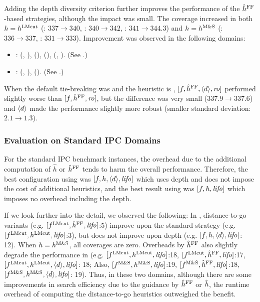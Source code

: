 Adding the depth diversity criterion further improves the performance of the $\hat{h}^{\text{FF}}$-based strategies,
 although the impact was small.
The coverage increased in both
 $h=h^\text{LMcut}$ (\fifo: $337\rightarrow 340$, \lifo: $340\rightarrow 342$, \ro: $341\rightarrow 344.3$) and
 $h=h^\text{M\&S}$ (\fifo: $336\rightarrow 337$, \lifo: $331\rightarrow 333$).
Improvement was observed in the following domains:
\begin{itemize}
 \item \textbf{\lmcut}:  (\lifo, \ro),  (\ro),  (\fifo),  (\fifo, \ro). (See .)
 \item \textbf{\mands}:  (\lifo, \ro),  (\fifo). (See .)
\end{itemize}
When the default tie-breaking was \ro and the heuristic is \mands, $[f,\hat{h}^{\text{FF}},{\left<d\right>},{\text{\textit{ro}}}]$ performed slightly worse than 
$[f,\hat{h}^{\text{FF}},{\text{\textit{ro}}}]$, but the difference was very small  ($337.9\rightarrow 337.6$) and ${\left<d\right>}$ made the performance slightly more robust (smaller standard deviation: $2.1\rightarrow 1.3$).

\subsubsection{Evaluation on Standard IPC Domains}

For the standard IPC benchmark instances, the overhead due to the additional computation of
$\hat{h}$ or $\hat{h}^{\text{FF}}$ tends to harm the overall performance.
Therefore, the best configuration using \lmcut was
$[f,h,{\left<d\right>},{\text{\textit{lifo}}}]$ which uses depth and does not impose the cost of
additional heuristics, and the best result using \mands
was $[f,h,{\text{\textit{lifo}}}]$ which imposes no overhead including the depth.

If we look further into the detail, we observed the following:
In , distance-to-go variants (e.g. $[f^\text{LMcut},\hat{h}^{\text{FF}},{\text{\textit{lifo}}}]$:5) improve upon the standard strategy (e.g. $[f^\text{LMcut},h^\text{LMcut},{\text{\textit{lifo}}}]$:3), but does not improve upon depth (e.g. $[f,h,{\left<d\right>},{\text{\textit{lifo}}}]$: 12). When $h=h^\text{M\&S}$, all coverages are zero. Overheads by $\hat{h}^{\text{FF}}$ also slightly degrade the performance in  (e.g. $[f^\text{LMcut},h^\text{LMcut},{\text{\textit{lifo}}}]$:18, $[f^\text{LMcut},\hat{h}^{\text{FF}},{\text{\textit{lifo}}}]$:17, $[f^\text{LMcut},h^\text{LMcut},{\left<d\right>},{\text{\textit{lifo}}}]$: 18; Also, $[f^\text{M\&S},h^\text{M\&S},{\text{\textit{lifo}}}]$:19, $[f^\text{M\&S},\hat{h}^{\text{FF}},{\text{\textit{lifo}}}]$:18, $[f^\text{M\&S},h^\text{M\&S},{\left<d\right>},{\text{\textit{lifo}}}]$: 19). Thus, in these two domains, although there are some improvements in search efficiency due to the guidance by $\hat{h}^{\text{FF}}$ or $\hat{h}$, the runtime overhead of computing the  distance-to-go heuristics outweighed the benefit.
 
